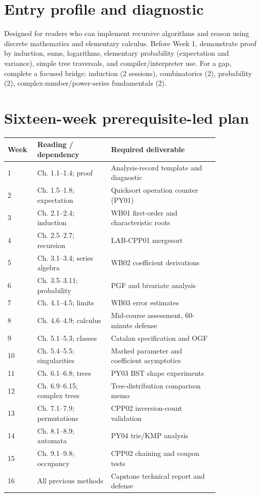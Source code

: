 \documentclass[11pt]{article}
\begin{document}
\makedoctocpage

\section{Entry profile and diagnostic}
Designed for readers who can implement recursive algorithms and reason using discrete mathematics and elementary calculus. Before Week 1, demonstrate proof by induction, sums, logarithms, elementary probability (expectation and variance), simple tree traversals, and compiler/interpreter use. For a gap, complete a focused bridge: induction (2 sessions), combinatorics (2), probability (2), complex-number/power-series fundamentals (2).
\section{Sixteen-week prerequisite-led plan}
\begin{longtable}{p{0.09\linewidth}p{0.30\linewidth}p{0.44\linewidth}}\toprule Week & Reading / dependency & Required deliverable \\ \midrule
1 & Ch. 1.1--1.4; proof & Analysis-record template and diagnostic \\
2 & Ch. 1.5--1.8; expectation & Quicksort operation counter (PY01) \\
3 & Ch. 2.1--2.4; induction & WB01 first-order and characteristic roots \\
4 & Ch. 2.5--2.7; recursion & LAB-CPP01 mergesort \\
5 & Ch. 3.1--3.4; series algebra & WB02 coefficient derivations \\
6 & Ch. 3.5--3.11; probability & PGF and bivariate analysis \\
7 & Ch. 4.1--4.5; limits & WB03 error estimates \\
8 & Ch. 4.6--4.9; calculus & Mid-course assessment, 60-minute defense \\
9 & Ch. 5.1--5.3; classes & Catalan specification and OGF \\
10 & Ch. 5.4--5.5; singularities & Marked parameter and coefficient asymptotics \\
11 & Ch. 6.1--6.8; trees & PY03 BST shape experiments \\
12 & Ch. 6.9--6.15; complex trees & Tree-distribution comparison memo \\
13 & Ch. 7.1--7.9; permutations & CPP02 inversion-count validation \\
14 & Ch. 8.1--8.9; automata & PY04 trie/KMP analysis \\
15 & Ch. 9.1--9.8; occupancy & CPP02 chaining and coupon tests \\
16 & All previous methods & Capstone technical report and defense \\
\bottomrule\end{longtable}
\end{document}
